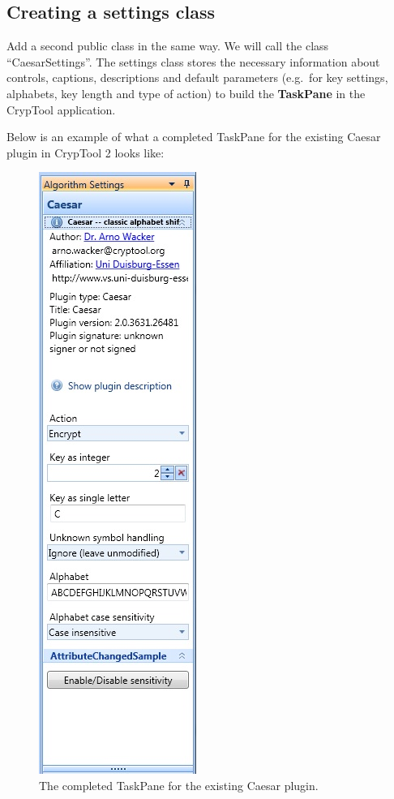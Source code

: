 \subsection{Creating a settings class}
\label{sec:CreatingASettingsClass}

Add a second public class in the same way. We will call the class ``CaesarSettings''. The settings class stores the necessary information about controls, captions, descriptions and default parameters (e.g.\ for key settings, alphabets, key length and type of action) to build the \textbf{TaskPane} in the CrypTool application.
\clearpage

\noindent Below is an example of what a completed TaskPane for the existing Caesar plugin in CrypTool 2 looks like:

\begin{figure}[h!]
	\centering
		\includegraphics{figures/task_pane.jpg}
	\caption{The completed TaskPane for the existing Caesar plugin.}
	\label{fig:task_pane}
\end{figure}
\clearpage

